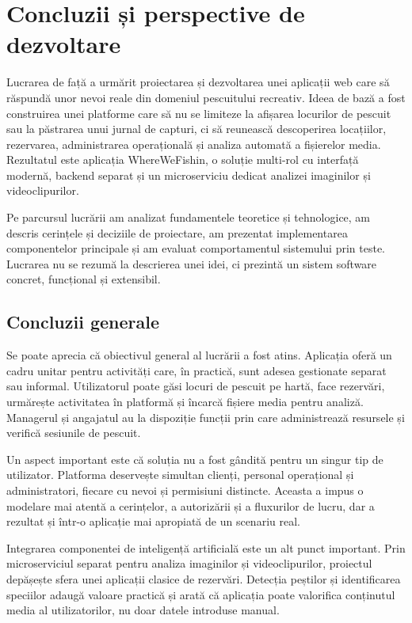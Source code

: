 ﻿\chapter{Concluzii și perspective de dezvoltare}

Lucrarea de față a urmărit proiectarea și dezvoltarea unei aplicații web care să răspundă unor nevoi reale din domeniul pescuitului recreativ. Ideea de bază a fost construirea unei platforme care să nu se limiteze la afișarea locurilor de pescuit sau la păstrarea unui jurnal de capturi, ci să reunească descoperirea locațiilor, rezervarea, administrarea operațională și analiza automată a fișierelor media. Rezultatul este aplicația WhereWeFishin, o soluție multi-rol cu interfață modernă, backend separat și un microserviciu dedicat analizei imaginilor și videoclipurilor.

Pe parcursul lucrării am analizat fundamentele teoretice și tehnologice, am descris cerințele și deciziile de proiectare, am prezentat implementarea componentelor principale și am evaluat comportamentul sistemului prin teste. Lucrarea nu se rezumă la descrierea unei idei, ci prezintă un sistem software concret, funcțional și extensibil.

\section{Concluzii generale}

Se poate aprecia că obiectivul general al lucrării a fost atins. Aplicația oferă un cadru unitar pentru activități care, în practică, sunt adesea gestionate separat sau informal. Utilizatorul poate găsi locuri de pescuit pe hartă, face rezervări, urmărește activitatea în platformă și încarcă fișiere media pentru analiză. Managerul și angajatul au la dispoziție funcții prin care administrează resursele și verifică sesiunile de pescuit.

Un aspect important este că soluția nu a fost gândită pentru un singur tip de utilizator. Platforma deservește simultan clienți, personal operațional și administratori, fiecare cu nevoi și permisiuni distincte. Aceasta a impus o modelare mai atentă a cerințelor, a autorizării și a fluxurilor de lucru, dar a rezultat și într-o aplicație mai apropiată de un scenariu real.

Integrarea componentei de inteligență artificială este un alt punct important. Prin microserviciul separat pentru analiza imaginilor și videoclipurilor, proiectul depășește sfera unei aplicații clasice de rezervări. Detecția peștilor și identificarea speciilor adaugă valoare practică și arată că aplicația poate valorifica conținutul media al utilizatorilor, nu doar datele introduse manual.

